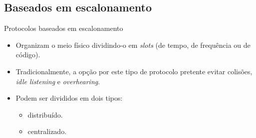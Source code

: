 \documentclass{beamer}
\begin{document}
\subsection{Baseados em escalonamento}

\begin{frame}{Protocolos baseados em escalonamento}

  \begin{itemize}
  \item
    Organizam o meio físico dividindo-o em \emph{slots} (de tempo, de frequência ou de código).
  \item
    Tradicionalmente, a opção por este tipo de protocolo pretente evitar colisões, \emph{idle listening} e \emph{overhearing}.
  \item
    Podem ser divididos em dois tipos:
      \begin{itemize}
	\item distribuído.
	\item centralizado.
      \end{itemize}
  \end{itemize}
  
\end{frame}
\end{document}
